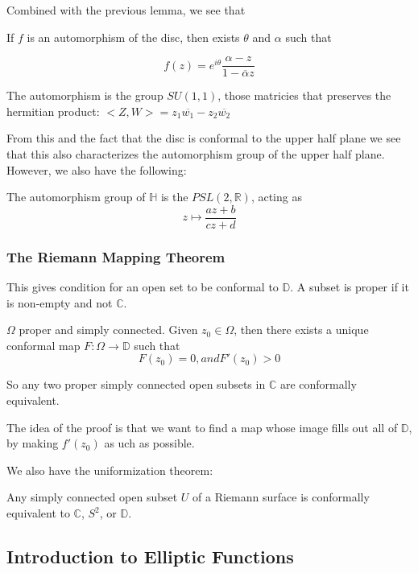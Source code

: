 \documentclass[main.tex]{subfiles}
\begin{document}
Combined with the previous lemma, we see that
\begin{theorem}
If $f$ is an automorphism of the disc, then exists $\theta$ and $\alpha$ such that 

$$
f(z) = e^{i\theta}\frac{\alpha - z}{1 - \overline{\alpha} z}
$$
\end{theorem}

The automorphism is the group $SU(1,1)$, those matricies that preserves the hermitian product:
$<Z, W> = z_1 \overline{w_1} - z_2 \overline{w_2}$

From this and the fact that the disc is conformal to the upper half plane we see that this also characterizes the automorphism group of the upper half plane. However, we also have the following:

\begin{theorem}
The automorphism group of $\mathbb{H}$ is the $PSL(2, \mathbb{R})$, acting as 
$$
z \mapsto \frac{az +b}{cz + d}
$$
\end{theorem}

\subsubsection{The Riemann Mapping Theorem}
This gives condition for an open set to be conformal to $\mathbb{D}$. A subset is proper if it is non-empty and not $\mathbb{C}$.

\begin{theorem}
$\Omega$ proper and simply connected. Given $z_0 \in \Omega$, then there exists a unique conformal map $F: \Omega \rightarrow \mathbb{D}$ such that 
$$
F(z_0) = 0, and F'(z_0) > 0
$$
\end{theorem}
So any two proper simply connected open subsets in $\mathbb{C}$ are conformally equivalent.

The idea of the proof is that we want to find a map whose image fills out all of $\mathbb{D}$, by making $f'(z_0)$ as uch as possible.

We also have the uniformization theorem:

\begin{theorem}
Any simply connected open subset $U$ of a Riemann surface is conformally equivalent to $\mathbb{C}$, $S^2$, or $\mathbb{D}$.
\end{theorem}

\subsection{Introduction to Elliptic Functions}
\end{document}
